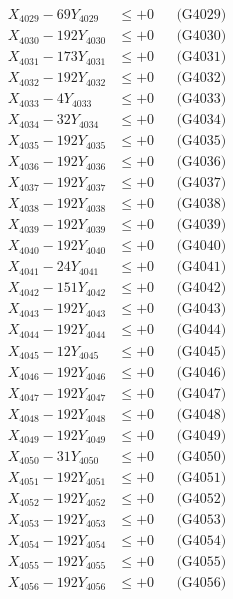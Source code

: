 \documentclass[a4paper,10pt]{article}
\begin{document}
{\begin{align}
X_{4029} - 69Y_{4029} &\leq +0 && \text{(G4029)} \\
X_{4030} - 192Y_{4030} &\leq +0 && \text{(G4030)} \\
\allowbreak
X_{4031} - 173Y_{4031} &\leq +0 && \text{(G4031)} \\
X_{4032} - 192Y_{4032} &\leq +0 && \text{(G4032)} \\
X_{4033} - 4Y_{4033} &\leq +0 && \text{(G4033)} \\
X_{4034} - 32Y_{4034} &\leq +0 && \text{(G4034)} \\
X_{4035} - 192Y_{4035} &\leq +0 && \text{(G4035)} \\
X_{4036} - 192Y_{4036} &\leq +0 && \text{(G4036)} \\
X_{4037} - 192Y_{4037} &\leq +0 && \text{(G4037)} \\
X_{4038} - 192Y_{4038} &\leq +0 && \text{(G4038)} \\
X_{4039} - 192Y_{4039} &\leq +0 && \text{(G4039)} \\
X_{4040} - 192Y_{4040} &\leq +0 && \text{(G4040)} \\
\allowbreak
X_{4041} - 24Y_{4041} &\leq +0 && \text{(G4041)} \\
X_{4042} - 151Y_{4042} &\leq +0 && \text{(G4042)} \\
X_{4043} - 192Y_{4043} &\leq +0 && \text{(G4043)} \\
X_{4044} - 192Y_{4044} &\leq +0 && \text{(G4044)} \\
X_{4045} - 12Y_{4045} &\leq +0 && \text{(G4045)} \\
X_{4046} - 192Y_{4046} &\leq +0 && \text{(G4046)} \\
X_{4047} - 192Y_{4047} &\leq +0 && \text{(G4047)} \\
X_{4048} - 192Y_{4048} &\leq +0 && \text{(G4048)} \\
X_{4049} - 192Y_{4049} &\leq +0 && \text{(G4049)} \\
X_{4050} - 31Y_{4050} &\leq +0 && \text{(G4050)} \\
\allowbreak
X_{4051} - 192Y_{4051} &\leq +0 && \text{(G4051)} \\
X_{4052} - 192Y_{4052} &\leq +0 && \text{(G4052)} \\
X_{4053} - 192Y_{4053} &\leq +0 && \text{(G4053)} \\
X_{4054} - 192Y_{4054} &\leq +0 && \text{(G4054)} \\
X_{4055} - 192Y_{4055} &\leq +0 && \text{(G4055)} \\
X_{4056} - 192Y_{4056} &\leq +0 && \text{(G4056)} \\

\end{align}}
\end{document}
